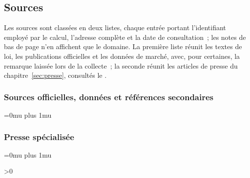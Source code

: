 \subsection{Sources}\label{sec:annexe-sources}

Les sources sont class\'ees en deux listes, chaque entr\'ee portant l'identifiant employ\'e par le
calcul, l'adresse compl\`ete et la date de consultation~; les notes de bas de page n'en affichent que
le domaine. La premi\`ere liste r\'eunit les textes de loi, les publications officielles et les donn\'ees
de march\'e, avec, pour certaines, la remarque laiss\'ee lors de la collecte~; la seconde r\'eunit les
articles de presse du chapitre~\ref{sec:presse}, consult\'es le \PresseDateConsultation.

\newcommand{\AnnexeCoupuresUrl}{%
  \def\UrlBreaks{\do\.\do\/\do\_\do\-\do\=\do\?\do\&%
    \do\a\do\b\do\c\do\d\do\e\do\f\do\g\do\h\do\i\do\j\do\k\do\l\do\m\do\n\do\o\do\p\do\q\do\r\do\s\do\t\do\u\do\v\do\w\do\x\do\y\do\z%
    \do\A\do\B\do\C\do\D\do\E\do\F\do\G\do\H\do\I\do\J\do\K\do\L\do\M\do\N\do\O\do\P\do\Q\do\R\do\S\do\T\do\U\do\V\do\W\do\X\do\Y\do\Z}%
  \Urlmuskip=0mu plus 1mu\relax}

\subsubsection{Sources officielles, donn\'ees et r\'ef\'erences secondaires}\label{sec:annexe-sources-officielles}

{\small\raggedright\AnnexeCoupuresUrl\par}

\subsubsection{Presse sp\'ecialis\'ee}\label{sec:annexe-sources-presse}

{\small\raggedright\AnnexeCoupuresUrl\par}

\ifnum\NombreReferencesAcademiques>0
  \label{sec:annexe-references}
  
  
\else
